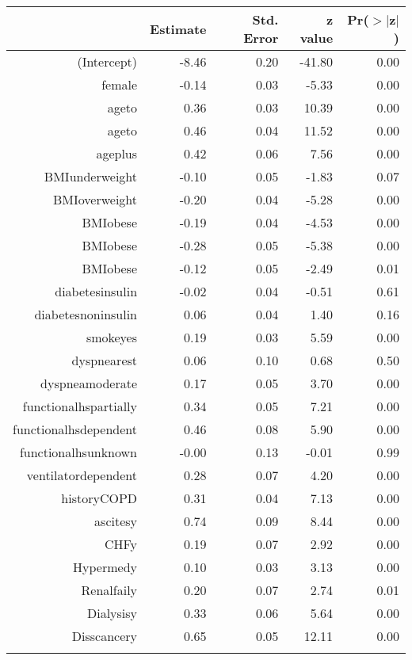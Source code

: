 \bigskip\bigskip
\centering
\begin{tabular}{rrrrr}
  \hline
 & Estimate & Std. Error & z value & Pr($>$$|$z$|$) \\ 
  \hline
(Intercept) & -8.46 & 0.20 & -41.80 & 0.00 \\ 
  female & -0.14 & 0.03 & -5.33 & 0.00 \\ 
  age\-65\-to\-74 & 0.36 & 0.03 & 10.39 & 0.00 \\ 
  age\-75\-to\-84 & 0.46 & 0.04 & 11.52 & 0.00 \\ 
  age\-85\-plus & 0.42 & 0.06 & 7.56 & 0.00 \\ 
  BMI\-underweight & -0.10 & 0.05 & -1.83 & 0.07 \\ 
  BMI\-overweight & -0.20 & 0.04 & -5.28 & 0.00 \\ 
  BMI\-obese\-1 & -0.19 & 0.04 & -4.53 & 0.00 \\ 
  BMI\-obese\-2 & -0.28 & 0.05 & -5.38 & 0.00 \\ 
  BMI\-obese\-3 & -0.12 & 0.05 & -2.49 & 0.01 \\ 
  diabetes\-insulin & -0.02 & 0.04 & -0.51 & 0.61 \\ 
  diabetes\-noninsulin & 0.06 & 0.04 & 1.40 & 0.16 \\ 
  smoke\-yes & 0.19 & 0.03 & 5.59 & 0.00 \\ 
  dyspnea\-rest & 0.06 & 0.10 & 0.68 & 0.50 \\ 
  dyspnea\-moderate & 0.17 & 0.05 & 3.70 & 0.00 \\ 
  functional\-hs\-partially & 0.34 & 0.05 & 7.21 & 0.00 \\ 
  functional\-hs\-dependent & 0.46 & 0.08 & 5.90 & 0.00 \\ 
  functional\-hs\-unknown & -0.00 & 0.13 & -0.01 & 0.99 \\ 
  ventilator\-dependent & 0.28 & 0.07 & 4.20 & 0.00 \\ 
  history\-COPD & 0.31 & 0.04 & 7.13 & 0.00 \\ 
  ascites\-y & 0.74 & 0.09 & 8.44 & 0.00 \\ 
  CHF\-y & 0.19 & 0.07 & 2.92 & 0.00 \\ 
  Hyper\-med\-y & 0.10 & 0.03 & 3.13 & 0.00 \\ 
  Renal\-fail\-y & 0.20 & 0.07 & 2.74 & 0.01 \\ 
  Dialysis\-y & 0.33 & 0.06 & 5.64 & 0.00 \\ 
  Diss\-cancer\-y & 0.65 & 0.05 & 12.11 & 0.00 \\ 
$$
\end{tabular}

